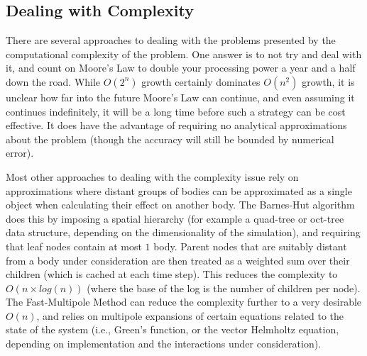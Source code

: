 \documentclass[10pt,twocolumn]{article}
\begin{document}
	\subsection{Dealing with Complexity}
	\label{sec:complexity}
	There are several approaches to dealing with the problems presented by the computational complexity of the problem. One answer is to
	not try and deal with it, and count on Moore's Law to double your processing power a year and a half down the road. While $O(2^{n})$
	growth certainly dominates $O(n^{2})$ growth, it is unclear how far into the future Moore's Law can continue, and even assuming it continues
	indefinitely, it will be a long time before such a strategy can be cost effective. It does have the advantage of requiring no analytical
	approximations about the problem (though the accuracy will still be bounded by numerical error).
	
	Most other approaches to dealing with the complexity issue rely on approximations where distant groups of bodies can be approximated
	as a single object when calculating their effect on another body. The Barnes-Hut algorithm does this by imposing a spatial hierarchy
	(for example a quad-tree or oct-tree data structure, depending on the dimensionality of the simulation), and requiring that leaf nodes contain
	at most $1$ body. Parent nodes that are suitably distant from a body under consideration are then treated as a weighted sum over their children
	(which is cached at each time step). This reduces the complexity to $O(n \times log(n))$ (where the base of the log is the number of children per node).
	The Fast-Multipole Method can reduce the complexity further to a very desirable $O(n)$, and relies on multipole expansions of certain equations
	related to the state of the system (i.e., Green's function, or the vector Helmholtz equation, depending on implementation and the interactions
	under consideration).
	
\end{document}
